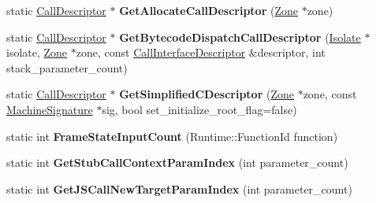 \begin{DoxyCompactItemize}
\item 
static \hyperlink{classv8_1_1internal_1_1compiler_1_1_call_descriptor}{Call\+Descriptor} $\ast$ {\bfseries Get\+Allocate\+Call\+Descriptor} (\hyperlink{classv8_1_1internal_1_1_zone}{Zone} $\ast$zone)\hypertarget{classv8_1_1internal_1_1compiler_1_1_linkage_a5768b94b10c80e442a09047e37ac7ece}{}\label{classv8_1_1internal_1_1compiler_1_1_linkage_a5768b94b10c80e442a09047e37ac7ece}

\item 
static \hyperlink{classv8_1_1internal_1_1compiler_1_1_call_descriptor}{Call\+Descriptor} $\ast$ {\bfseries Get\+Bytecode\+Dispatch\+Call\+Descriptor} (\hyperlink{classv8_1_1internal_1_1_isolate}{Isolate} $\ast$isolate, \hyperlink{classv8_1_1internal_1_1_zone}{Zone} $\ast$zone, const \hyperlink{classv8_1_1internal_1_1_call_interface_descriptor}{Call\+Interface\+Descriptor} \&descriptor, int stack\+\_\+parameter\+\_\+count)\hypertarget{classv8_1_1internal_1_1compiler_1_1_linkage_a778aca734302845c0d9e42a61e867a8c}{}\label{classv8_1_1internal_1_1compiler_1_1_linkage_a778aca734302845c0d9e42a61e867a8c}

\item 
static \hyperlink{classv8_1_1internal_1_1compiler_1_1_call_descriptor}{Call\+Descriptor} $\ast$ {\bfseries Get\+Simplified\+C\+Descriptor} (\hyperlink{classv8_1_1internal_1_1_zone}{Zone} $\ast$zone, const \hyperlink{classv8_1_1internal_1_1_signature}{Machine\+Signature} $\ast$sig, bool set\+\_\+initialize\+\_\+root\+\_\+flag=false)\hypertarget{classv8_1_1internal_1_1compiler_1_1_linkage_a3edd7f4433b17693cd6de2a29ca29001}{}\label{classv8_1_1internal_1_1compiler_1_1_linkage_a3edd7f4433b17693cd6de2a29ca29001}

\item 
static int {\bfseries Frame\+State\+Input\+Count} (Runtime\+::\+Function\+Id function)\hypertarget{classv8_1_1internal_1_1compiler_1_1_linkage_a406c9221a4da9e734cfb3ad1dad75ed9}{}\label{classv8_1_1internal_1_1compiler_1_1_linkage_a406c9221a4da9e734cfb3ad1dad75ed9}

\item 
static int {\bfseries Get\+Stub\+Call\+Context\+Param\+Index} (int parameter\+\_\+count)\hypertarget{classv8_1_1internal_1_1compiler_1_1_linkage_a31ce646746b89a4b0530561108277f9b}{}\label{classv8_1_1internal_1_1compiler_1_1_linkage_a31ce646746b89a4b0530561108277f9b}

\item 
static int {\bfseries Get\+J\+S\+Call\+New\+Target\+Param\+Index} (int parameter\+\_\+count)\hypertarget{classv8_1_1internal_1_1compiler_1_1_linkage_af762f3466c13483c3b6d62bcd5e9ac9f}{}\label{classv8_1_1internal_1_1compiler_1_1_linkage_af762f3466c13483c3b6d62bcd5e9ac9f}


\end{DoxyCompactItemize}

